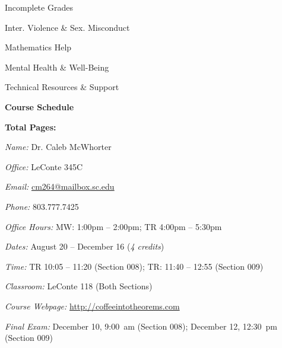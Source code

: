\documentclass[11pt,letterpaper]{article}
\makeatletter
\newcommand{\classdates}{August 20 -- December 16 (\textit{4 credits})}
\newcommand{\classtimes}{TR 10:05 -- 11:20 (Section 008); TR: 11:40 -- 12:55 (Section 009)}
\newcommand{\classroom}{LeConte 118 (Both Sections)}
\newcommand{\instructor}{Dr. Caleb McWhorter}
\newcommand{\office}{LeConte 345C}
\newcommand{\phone}{803.777.7425}
\newcommand{\email}{cm264@mailbox.sc.edu}
\newcommand{\website}{http://coffeeintotheorems.com}
\newcommand{\officehours}{MW: 1:00pm -- 2:00pm; TR 4:00pm -- 5:30pm}
\makeatother
\begin{document}
\begin{minipage}[t]{0.45\textwidth}
\hspace{0.3cm} Incomplete Grades \dotfill \pageref{univ_incomplete} \par
\hspace{0.3cm} Inter. Violence \& Sex. Misconduct \dotfill \pageref{univ_viosexmis} \par
\hspace{0.3cm} Mathematics Help \dotfill \pageref{univ_mathhelp} \par
\hspace{0.3cm} Mental Health \& Well-Being \dotfill \pageref{univ_mental} \par
\hspace{0.3cm} Technical Resources \& Support \dotfill \pageref{univ_techsupport} \par
{\bfseries\color{scred} Course Schedule} \dotfill \pageref{schd} \par
\hfill {\bfseries\color{scred} Total Pages:} \pageref*{LastPage}
\end{minipage}
\par\vspace{0cm}






\vspace{-0.1cm}  \vspace{-0.2cm}

\textit{Name:} \instructor \par
\textit{Office:} \office \par
\textit{Email:} \href{mailto:\email}{\email} \par
\textit{Phone:} \phone \par
\textit{Office Hours:} \officehours 
\pspace



\textit{Dates:} \classdates \par
\textit{Time:} \classtimes \par
\textit{Classroom:} \classroom \par
\textit{Course Webpage:} \href{\website}{\website} \par
\textit{Final Exam:} December 10, 9:00~am (Section 008); December 12, 12:30~pm (Section 009)
\sectionbreak
\end{document}
